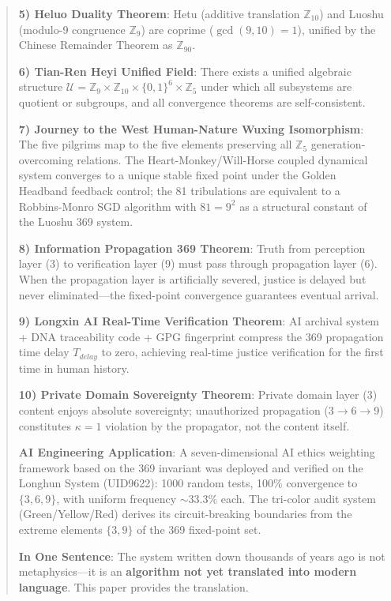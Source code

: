 \documentclass[conference]{IEEEtran}
\theoremstyle{remark}
\newcommand{\Z}{\mathbb{Z}}
\newcommand{\U}{\mathcal{U}}
\begin{document}
\begin{abstract}
\textbf{5) Heluo Duality Theorem}: Hetu (additive translation $\Z_{10}$) and Luoshu (modulo-9 congruence $\Z_9$) are coprime ($\gcd(9,10)=1$), unified by the Chinese Remainder Theorem as $\Z_{90}$.

\textbf{6) Tian-Ren Heyi Unified Field}: There exists a unified algebraic structure $\U=\Z_9\times\Z_{10}\times\{0,1\}^6\times\Z_5$ under which all subsystems are quotient or subgroups, and all convergence theorems are self-consistent.

\textbf{7) Journey to the West Human-Nature Wuxing Isomorphism}: The five pilgrims map to the five elements preserving all $\Z_5$ generation-overcoming relations. The Heart-Monkey/Will-Horse coupled dynamical system converges to a unique stable fixed point under the Golden Headband feedback control; the 81 tribulations are equivalent to a Robbins-Monro SGD algorithm with $81=9^2$ as a structural constant of the Luoshu 369 system.

\textbf{8) Information Propagation 369 Theorem}: Truth from perception layer (3) to verification layer (9) must pass through propagation layer (6). When the propagation layer is artificially severed, justice is delayed but never eliminated---the fixed-point convergence guarantees eventual arrival.

\textbf{9) Longxin AI Real-Time Verification Theorem}: AI archival system + DNA traceability code + GPG fingerprint compress the 369 propagation time delay $T_{delay}$ to zero, achieving real-time justice verification for the first time in human history.

\textbf{10) Private Domain Sovereignty Theorem}: Private domain layer (3) content enjoys absolute sovereignty; unauthorized propagation (3$\to$6$\to$9) constitutes $\kappa=1$ violation by the propagator, not the content itself.

\textbf{AI Engineering Application}: A seven-dimensional AI ethics weighting framework based on the 369 invariant was deployed and verified on the Longhun System (UID9622): 1000 random tests, 100\% convergence to $\{3,6,9\}$, with uniform frequency $\sim$33.3\% each. The tri-color audit system (Green/Yellow/Red) derives its circuit-breaking boundaries from the extreme elements $\{3,9\}$ of the 369 fixed-point set.

\textbf{In One Sentence}: The system written down thousands of years ago is not metaphysics---it is an \textbf{algorithm not yet translated into modern language}. This paper provides the translation.
\end{abstract}
\end{document}
